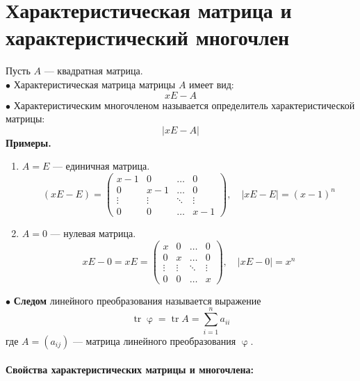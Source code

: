 \documentclass[a4paper, 12pt]{article}
\newcommand{\tr}{\operatorname{tr}}
\renewcommand{\varphi}{\upvarphi}
\begin{document}
    \section{Характеристическая матрица и характеристический многочлен}
    Пусть $A$ --- квадратная матрица.\\
    $\bullet$ Характеристическая матрица матрицы $A$ имеет вид:
    $$xE-A$$
    $\bullet$ Характеристическим многочленом называется определитель характеристической матрицы:
    $$|xE-A|$$
    \textbf{Примеры.}
    \begin{enumerate}
        \item $A=E$ --- единичная матрица.\\
        $$(xE-E) = 
        \begin{pmatrix}
        x-1 & 0 & \dots & 0\\
        0 & x-1 & \dots & 0\\
        \vdots & \vdots & \ddots & \vdots\\
        0 & 0 & \dots & x - 1
        \end{pmatrix}, \quad
        |xE-E| = (x-1)^n$$
        \item $A = 0$ --- нулевая матрица.\\
        $$xE-0=xE= 
        \begin{pmatrix}
        x & 0 & \dots & 0\\
        0 & x & \dots & 0\\
        \vdots & \vdots & \ddots & \vdots\\
        0 & 0 & \dots & x
        \end{pmatrix}, \quad |xE-0| = x^n$$
    \end{enumerate}
    $\bullet$ \textbf{Следом} линейного преобразования называется выражение
    $$\tr \varphi = \tr A = \sum^n_{i=1}a_{ii}$$
    где $A = (a_{ij})$ --- матрица линейного преобразования $\varphi$.\\\\
    \textbf{Свойства характеристических матрицы и многочлена:}
\end{document}
